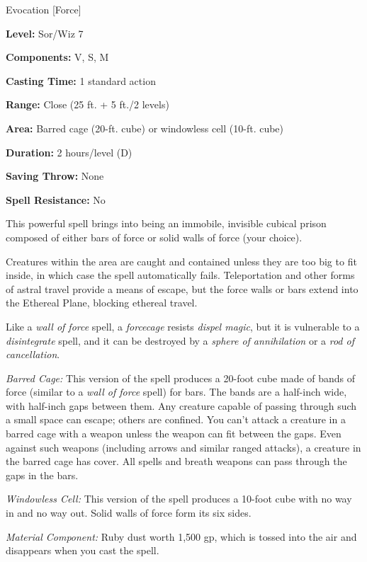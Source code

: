
Evocation [Force]

\textbf{Level:} Sor/Wiz 7

\textbf{Components:} V, S, M

\textbf{Casting Time:} 1 standard action

\textbf{Range:} Close (25 ft. + 5 ft./2 levels)

\textbf{Area:} Barred cage (20-ft. cube) or windowless cell (10-ft. cube)

\textbf{Duration:} 2 hours/level (D)

\textbf{Saving Throw:} None

\textbf{Spell Resistance:} No

This powerful spell brings into being an immobile, invisible cubical prison composed 
of either bars of force or solid walls of force (your choice).

Creatures within the area are caught and contained unless they are too big to fit 
inside, in which case the spell automatically fails. Teleportation and other forms 
of astral travel provide a means of escape, but the force walls or bars extend 
into the Ethereal Plane, blocking ethereal travel.

Like a \textit{wall of force} spell, a \textit{forcecage} resists \textit{dispel 
magic}, but it is vulnerable to a \textit{disintegrate} spell, and it can be destroyed 
by a \textit{sphere of annihilation} or a \textit{rod of cancellation}.

\textit{Barred Cage:} This version of the spell produces a 20-foot cube made of 
bands of force (similar to a \textit{wall of force} spell) for bars. The bands 
are a half-inch wide, with half-inch gaps between them. Any creature capable of 
passing through such a small space can escape; others are confined. You can't attack 
a creature in a barred cage with a weapon unless the weapon can fit between the 
gaps. Even against such weapons (including arrows and similar ranged attacks), 
a creature in the barred cage has cover. All spells and breath weapons can pass 
through the gaps in the bars.

\textit{Windowless Cell:} This version of the spell produces a 10-foot cube with 
no way in and no way out. Solid walls of force form its six sides.

\textit{Material Component:} Ruby dust worth 1,500 gp, which is tossed into the 
air and disappears when you cast the spell.

